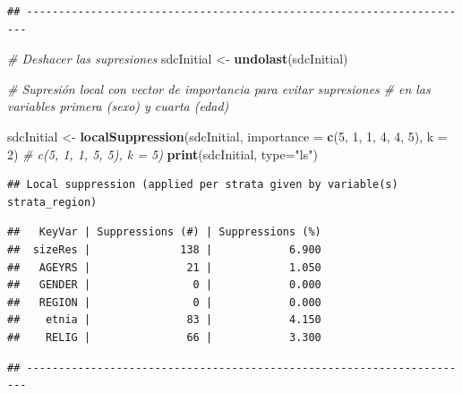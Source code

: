 \documentclass[]{book}
\newenvironment{Shaded}{\begin{snugshade}}{\end{snugshade}}
\newcommand{\CommentTok}[1]{\textcolor[rgb]{0.56,0.35,0.01}{\textit{#1}}}
\newcommand{\DataTypeTok}[1]{\textcolor[rgb]{0.13,0.29,0.53}{#1}}
\newcommand{\DecValTok}[1]{\textcolor[rgb]{0.00,0.00,0.81}{#1}}
\newcommand{\KeywordTok}[1]{\textcolor[rgb]{0.13,0.29,0.53}{\textbf{#1}}}
\newcommand{\NormalTok}[1]{#1}
\newcommand{\StringTok}[1]{\textcolor[rgb]{0.31,0.60,0.02}{#1}}
\theoremstyle{definition}
\theoremstyle{definition}
\theoremstyle{definition}
\theoremstyle{definition}
\theoremstyle{remark}
\begin{document}
\begin{verbatim}
## ----------------------------------------------------------------------
\end{verbatim}

\begin{Shaded}
\begin{Highlighting}[]
\CommentTok{# Deshacer las supresiones}
\NormalTok{sdcInitial <-}\StringTok{ }\KeywordTok{undolast}\NormalTok{(sdcInitial)}

\CommentTok{# Supresión local con vector de importancia para evitar supresiones}
\CommentTok{# en las variables primera (sexo) y cuarta (edad)}

\NormalTok{sdcInitial <-}\StringTok{ }\KeywordTok{localSuppression}\NormalTok{(sdcInitial, }\DataTypeTok{importance =} \KeywordTok{c}\NormalTok{(}\DecValTok{5}\NormalTok{, }\DecValTok{1}\NormalTok{, }\DecValTok{1}\NormalTok{, }\DecValTok{4}\NormalTok{, }\DecValTok{4}\NormalTok{, }\DecValTok{5}\NormalTok{), }\DataTypeTok{k =} \DecValTok{2}\NormalTok{) }\CommentTok{#  c(5, 1, 1, 5, 5), k = 5)}
\KeywordTok{print}\NormalTok{(sdcInitial, }\DataTypeTok{type=}\StringTok{"ls"}\NormalTok{)}
\end{Highlighting}
\end{Shaded}

\begin{verbatim}
## Local suppression (applied per strata given by variable(s) strata_region)
\end{verbatim}

\begin{verbatim}
##   KeyVar | Suppressions (#) | Suppressions (%)
##  sizeRes |              138 |            6.900
##   AGEYRS |               21 |            1.050
##   GENDER |                0 |            0.000
##   REGION |                0 |            0.000
##    etnia |               83 |            4.150
##    RELIG |               66 |            3.300
\end{verbatim}

\begin{verbatim}
## ----------------------------------------------------------------------
\end{verbatim}
\end{document}
